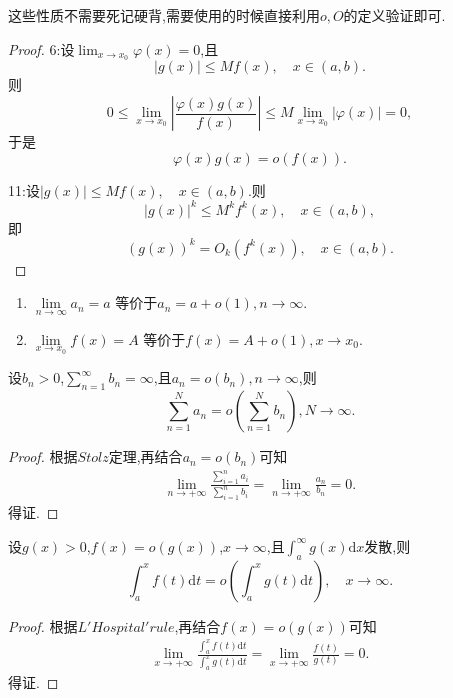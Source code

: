 \documentclass[lang=cn,newtx,10pt,scheme=chinese]{../Template/elegantbook}
\begin{document}
\begin{note}
这些性质不需要死记硬背,需要使用的时候直接利用$o,O$的定义验证即可.
\end{note}
\begin{proof}
{\color[RGB]{128, 128, 0} 6:}设\(\lim_{x\to x_0}\varphi(x) = 0\),且
\[
|g(x)|\leqslant  Mf(x),\quad x\in(a,b).
\]
则
\[
0\leqslant \lim_{x\to x_0}\left|\frac{\varphi(x)g(x)}{f(x)}\right|\leqslant  M\lim_{x\to x_0}|\varphi(x)| = 0,
\]
于是
\[
\varphi(x)g(x)=o(f(x)).
\]

{\color[RGB]{128, 128, 0} 11:}设\(|g(x)|\leqslant  Mf(x),\quad x\in(a,b)\).则
\[
|g(x)|^k\leqslant  M^k f^k(x),\quad x\in(a,b),
\]
即
\[
(g(x))^k = O_k(f^k(x)),\quad x\in(a,b).
\]
\end{proof}

\begin{proposition}[极限的等价定义]\label{proposition:极限的等价定义(用o余项定义极限)}
\begin{enumerate}
\item $\underset{n\rightarrow \infty}{\lim}a_n=a$
等价于$a_n=a+o\left( 1 \right) ,n\rightarrow \infty$.

\item $\underset{x\rightarrow x_0}{\lim}f\left( x \right) =A$
等价于$f\left( x \right) =A+o\left( 1 \right) ,x\rightarrow x_0$.
\end{enumerate}

\end{proposition}

\begin{theorem}\label{theorem:发散级数的求和号与o可交换}
设\(b_n>0\),\(\sum_{n = 1}^{\infty}b_n=\infty\),且\(a_n = o(b_n),n\to\infty\),则
\[
\sum_{n = 1}^{N}a_n=o\left(\sum_{n = 1}^{N}b_n\right),N\to\infty.
\]
\end{theorem}
\begin{proof}
根据$Stolz$定理,再结合$a_n=o\left( b_n \right)$可知
\begin{align*}
\underset{n\rightarrow +\infty}{\lim}\frac{\sum\limits_{i=1}^n{a_i}}{\sum\limits_{i=1}^n{b_i}}=\underset{n\rightarrow +\infty}{\lim}\frac{a_n}{b_n}=0.
\end{align*}得证.
\end{proof}

\begin{theorem}\label{theorem:发散积分的积分号与o可交换}
设\(g(x)>0\),\(f(x)=o(g(x))\),\(x\to\infty\),且\(\int_{a}^{\infty}g(x)\mathrm{d}x\)发散,则
\[
\int_{a}^{x}f(t)\mathrm{d}t = o\left(\int_{a}^{x}g(t)\mathrm{d}t\right),\quad x\to\infty.
\]
\end{theorem}
\begin{proof}
根据$L'Hospital'rule$,再结合$f(x)=o(g(x))$可知
\begin{align*}
\underset{x\rightarrow +\infty}{\lim}\frac{\int_a^x{f\left( t \right) \mathrm{d}t}}{\int_a^x{g\left( t \right) \mathrm{d}t}}=\underset{x\rightarrow +\infty}{\lim}\frac{f\left( t \right)}{g\left( t \right)}=0.
\end{align*}得证.
\end{proof}
\end{document}
